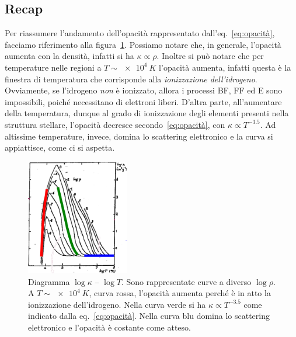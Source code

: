 \subsection{Recap}
Per riassumere l'andamento dell'opacità rappresentato dall'eq.~\eqref{eq:opacità}, facciamo riferimento alla figura~\ref{fig:opacità}. Possiamo notare che, in generale, l'opacità aumenta con la densità, infatti si ha $\kappa \propto \rho$. Inoltre si può notare che per temperature nelle regioni a $T \sim \SI{e4}{K}$ l'opacità aumenta, infatti questa è la finestra di temperatura che corrisponde alla \emph{ionizzazione dell'idrogeno}. Ovviamente, se l'idrogeno \emph{non} è ionizzato, allora i processi BF, FF ed E sono impossibili, poiché necessitano di elettroni liberi. D'altra parte, all'aumentare della temperatura, dunque al grado di ionizzazione degli elementi presenti nella struttura stellare, l'opacità decresce secondo~\eqref{eq:opacità}, con $\kappa \propto T^{-3.5}$. Ad altissime temperature, invece, domina lo scattering elettronico e la curva si appiattisce, come ci si  aspetta.

\begin{figure}
    \centering
    \includegraphics[width=0.4\textwidth]{immagini/opacita.png}
    \caption{Diagramma $\log \kappa$ -- $\log T$. Sono rappresentate curve a diverso $\log \rho$. A $T \sim \SI{e4}{K}$, curva rossa, l'opacità aumenta perché è in atto la ionizzazione dell'idrogeno. Nella curva verde si ha $\kappa \propto T^{-3.5}$ come indicato dalla eq.~\eqref{eq:opacità}. Nella curva blu domina lo scattering elettronico e l'opacità è costante come atteso.}
    \label{fig:opacità}
\end{figure}